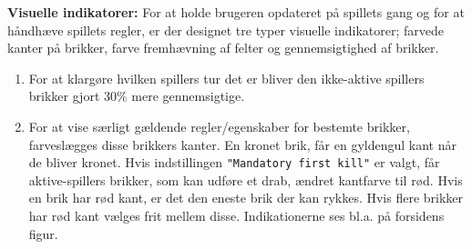 \textbf{Visuelle indikatorer:} For at holde brugeren opdateret på spillets gang og for at håndhæve spillets regler, er der designet tre typer visuelle indikatorer; farvede kanter på brikker, farve fremhævning af felter og gennemsigtighed af brikker. 
\begin{enumerate}
    \item For at klargøre hvilken spillers tur det er bliver den ikke-aktive spillers brikker gjort 30\% mere gennemsigtige.
    
    \item For at vise særligt gældende regler/egenskaber for bestemte brikker, farveslægges disse brikkers kanter. En kronet brik, får en gyldengul kant når de bliver kronet. Hvis indstillingen \texttt{"Mandatory first kill"} er valgt, får aktive-spillers brikker, som kan udføre et drab, ændret kantfarve til rød. Hvis en brik har rød kant, er det den eneste brik der kan rykkes. Hvis flere brikker har rød kant vælges frit mellem disse. Indikationerne ses bl.a. på forsidens figur. 
    

\end{enumerate}
